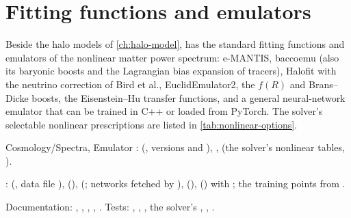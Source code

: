 \chapter{Fitting functions and emulators}\label{ch:fitting-emulators}

Beside the halo models of \cref{ch:halo-model}, \fml{} has the standard fitting functions and emulators of the nonlinear
matter power spectrum: e-MANTIS, baccoemu (also its baryonic boosts and the Lagrangian bias expansion of tracers), Halofit
with the neutrino correction of Bird et al., EuclidEmulator2, the $f(R)$ and Brans--Dicke boosts, the Eisenstein--Hu transfer functions, and a general neural-network emulator that can be trained in C++ or loaded
from PyTorch. The solver's selectable nonlinear prescriptions are listed in \cref{tab:nonlinear-options}.

\begin{modulebox}{Cosmology/Spectra, Emulator}
:  (, versions  and ),
,  (the solver's nonlinear tables, ).\par
{}:  (, data file ),
 (),  (; networks fetched by
),  (), 
() with ; the training points from .\par
Documentation: , ,
, , . Tests:
, , , the solver's ,
, .
\end{modulebox}

